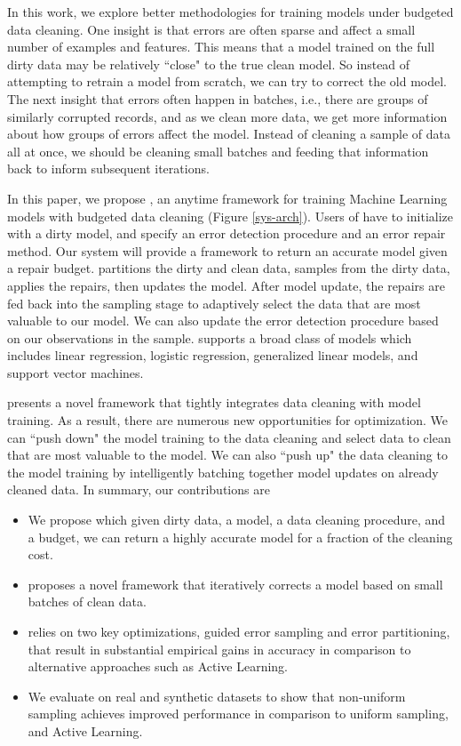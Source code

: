 In this work, we explore better methodologies for training models under budgeted data cleaning.
One insight is that errors are often sparse and affect a small number of examples and features.
This means that a model trained on the full dirty data may be relatively ``close" to the true clean model.
So instead of attempting to retrain a model from scratch, we can try to correct the old model.
The next insight that errors often happen in batches, i.e., there are groups of similarly corrupted records, and as we clean more data, we get more information about how groups of errors affect the model.
Instead of cleaning a sample of data all at once, we should be cleaning small batches and feeding that information back to inform subsequent iterations.

In this paper, we propose \sys, an anytime framework for training Machine Learning models with budgeted data cleaning (Figure \ref{sys-arch}).
Users of \sys have to initialize with a dirty model, and specify an error detection procedure and an error repair method.
Our system will provide a framework to return an accurate model given a repair budget.
\sys partitions the dirty and clean data, samples from the dirty data, applies the repairs, then updates the model.
After model update, the repairs are fed back into the sampling stage to adaptively select the data that are most valuable to our model.
We can also update the error detection procedure based on our observations in the sample.
\sys supports a broad class of models which includes linear regression, logistic regression, generalized linear models, and support vector machines.

\sys presents a novel framework that tightly integrates data cleaning with model training.
As a result, there are numerous new opportunities for optimization.
We can ``push down" the model training to the data cleaning and select data to clean that are most valuable to the model.
We can also ``push up" the data cleaning to the model training by intelligently batching together model updates on already cleaned data.
In summary, our contributions are
\begin{itemize}[noitemsep]
\item We propose \sysfull which given dirty data, a model, a data cleaning procedure, and a budget, we can return a highly accurate model for a fraction of the cleaning cost.
\item \sys proposes a novel framework that iteratively corrects a model based on small batches of clean data.
\item \sys relies on two key optimizations, guided error sampling and error partitioning, that result in substantial empirical gains in accuracy in comparison to alternative approaches such as Active Learning.
\item We evaluate \sysfull on real and synthetic datasets to show that non-uniform sampling achieves improved performance in comparison to uniform sampling, and Active Learning.
\end{itemize}








